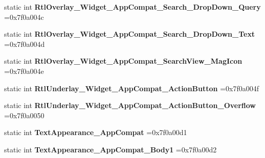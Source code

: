 \begin{DoxyCompactItemize}
static int {\bfseries Rtl\+Overlay\+\_\+\+Widget\+\_\+\+App\+Compat\+\_\+\+Search\+\_\+\+Drop\+Down\+\_\+\+Query} =0x7f0a004c
\item 
\mbox{\label{classandroid_1_1support_1_1graphics_1_1drawable_1_1R_1_1style_a4480b688ff3f973c2955707179e0c6b9}} 
static int {\bfseries Rtl\+Overlay\+\_\+\+Widget\+\_\+\+App\+Compat\+\_\+\+Search\+\_\+\+Drop\+Down\+\_\+\+Text} =0x7f0a004d
\item 
\mbox{\label{classandroid_1_1support_1_1graphics_1_1drawable_1_1R_1_1style_a948ec494e0df14b908943e7547dc9015}} 
static int {\bfseries Rtl\+Overlay\+\_\+\+Widget\+\_\+\+App\+Compat\+\_\+\+Search\+View\+\_\+\+Mag\+Icon} =0x7f0a004e
\item 
\mbox{\label{classandroid_1_1support_1_1graphics_1_1drawable_1_1R_1_1style_a316fadb31fdb1b00ead1d53c28e5e5b6}} 
static int {\bfseries Rtl\+Underlay\+\_\+\+Widget\+\_\+\+App\+Compat\+\_\+\+Action\+Button} =0x7f0a004f
\item 
\mbox{\label{classandroid_1_1support_1_1graphics_1_1drawable_1_1R_1_1style_a8eb442b3adf9f360ca3c5c180e00ec14}} 
static int {\bfseries Rtl\+Underlay\+\_\+\+Widget\+\_\+\+App\+Compat\+\_\+\+Action\+Button\+\_\+\+Overflow} =0x7f0a0050
\item 
\mbox{\label{classandroid_1_1support_1_1graphics_1_1drawable_1_1R_1_1style_ae7aab275fab803d9554f3b654ab50c88}} 
static int {\bfseries Text\+Appearance\+\_\+\+App\+Compat} =0x7f0a00d1
\item 
\mbox{\label{classandroid_1_1support_1_1graphics_1_1drawable_1_1R_1_1style_a908777f2f2cb183823afe947a47f9c60}} 
static int {\bfseries Text\+Appearance\+\_\+\+App\+Compat\+\_\+\+Body1} =0x7f0a00d2
\item 
\mbox{\label{classandroid_1_1support_1_1graphics_1_1drawable_1_1R_1_1style_a068b614662eede901b32c9fed7b7c397}} 

\end{DoxyCompactItemize}
